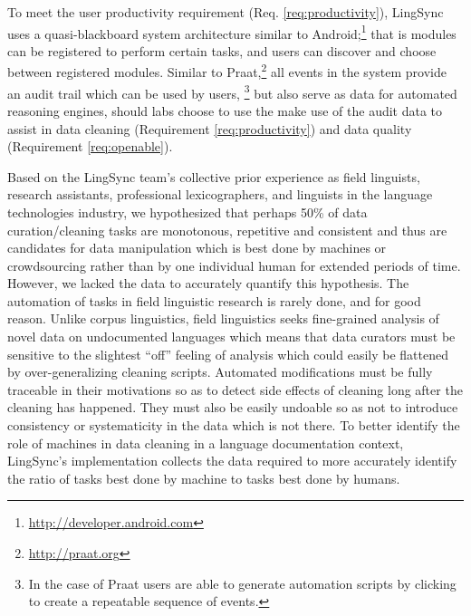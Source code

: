 \documentclass[11pt]{article}
\newcommand{\smalltodo}[2][]
    {\todo[caption={#2}, #1]
    {\tiny#2\normalsize}}
\begin{document}
To meet the user productivity requirement (Req. \autoref{req:productivity}),
LingSync uses a quasi-blackboard system architecture similar to
Android;\footnote{\url{http://developer.android.com}} that is modules can be
registered to perform certain tasks, and users can discover and choose between
registered modules. Similar to Praat,\footnote{\url{http://praat.org}}%
all events in the system provide an audit trail which can be used by users,%
\footnote{In the case of Praat users are able to generate automation scripts by clicking to create a repeatable sequence of events.}
but also serve as data for automated reasoning
engines, should labs choose to use the make use of the audit data to assist in data cleaning 
(Requirement \autoref{req:productivity}) and data quality (Requirement \autoref{req:openable}).

Based on the LingSync team's collective prior experience as field linguists, research
assistants, professional lexicographers, and linguists in the language
technologies industry, we hypothesized that perhaps 50\% of data
curation/cleaning tasks are monotonous, repetitive and consistent and thus are
candidates for data manipulation which is best done by machines or
crowdsourcing rather than by one individual human for extended periods of time.
However, we lacked the data to accurately quantify this hypothesis. 
The automation of tasks in field linguistic research is rarely done, and
for good reason. Unlike corpus linguistics, field linguistics seeks
fine-grained analysis of novel data on undocumented languages which means that
data curators must be sensitive to the slightest ``off'' feeling of analysis
which could easily be flattened by over-generalizing cleaning scripts. 
Automated modifications must be fully traceable in their motivations so as to
detect side effects of cleaning long after the cleaning has happened. They must
also be easily undoable so as not to introduce consistency or systematicity in
the data which is not there. %
To better identify the role of machines in data
cleaning in a language documentation context, LingSync's implementation
collects the data required to more accurately identify the ratio of tasks best done by machine to tasks best done by humans. 
\end{document}
